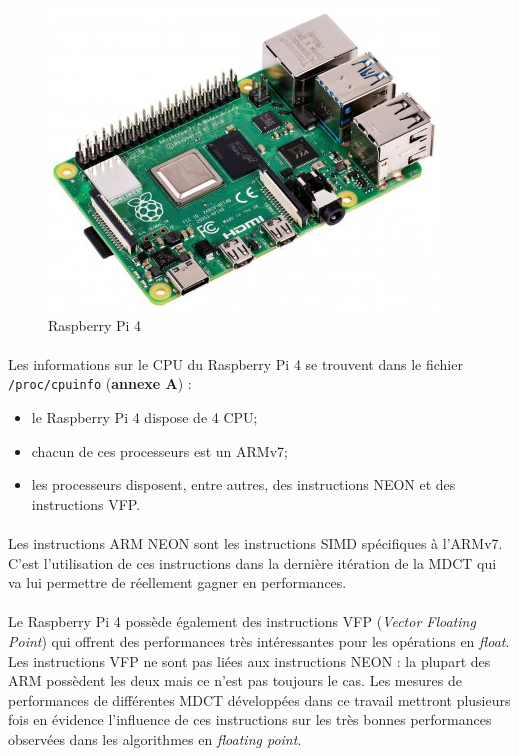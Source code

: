 \documentclass{article}
\begin{document}
    \begin{figure}[H]
        \centering
        \includegraphics[width=.4\linewidth]{./images/raspberry.png}
        \caption{Raspberry Pi 4}
        \label{fig:raspberry}
    \end{figure}

    \paragraph{}
    Les informations sur le CPU du Raspberry Pi 4 se trouvent dans le fichier \texttt{/proc/cpuinfo} (\textbf{annexe A}) :
    \begin{itemize}
        \item le Raspberry Pi 4 dispose de 4 CPU;
        \item chacun de ces processeurs est un ARMv7;
        \item les processeurs disposent, entre autres, des instructions NEON et des instructions VFP.
    \end{itemize}

    \paragraph{}
    Les instructions ARM NEON sont les instructions SIMD spécifiques à l'ARMv7. C'est l'utilisation de ces instructions dans la dernière itération de la MDCT qui va lui permettre de réellement gagner en performances.

    \paragraph{}
    Le Raspberry Pi 4 possède également des instructions VFP (\emph{Vector Floating Point}) qui offrent des performances très intéressantes pour les opérations en \emph{float}. Les instructions VFP ne sont pas liées aux instructions NEON : la plupart des ARM possèdent les deux mais ce n'est pas toujours le cas. Les mesures de performances de différentes MDCT développées dans ce travail mettront plusieurs fois en évidence l'influence de ces instructions sur les très bonnes performances observées dans les algorithmes en \emph{floating point}.
\end{document}
